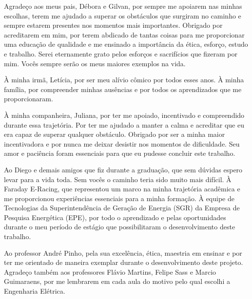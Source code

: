 \begin{agradecimentos}
\sloppy	

Agradeço aos meus pais, Débora e Gilvan, por sempre me apoiarem nas minhas escolhas, terem me ajudado a superar os obstáculos 
que surgiram no caminho e sempre estarem presentes nos momentos mais importantes. Obrigado por acreditarem em mim, por 
terem abdicado de tantas coisas para me proporcionar uma educação de qualidade e me ensinado a importância da ética, esforço, 
estudo e trabalho. Serei eternamente grato pelos esforços e sacrifícios que fizeram por mim. Vocês sempre serão os meus 
maiores exemplos na vida.

À minha irmã, Letícia, por ser meu alívio cômico por todos esses anos. À minha família, por compreender minhas ausências
e por todos os aprendizados que me proporcionaram.

À minha companheira, Juliana, por ter me apoiado, incentivado e compreendido durante essa trajetória. Por ter me 
ajudado a manter a calma e acreditar que eu era capaz de superar qualquer obstáculo. Obrigado por ser a
minha maior incentivadora e por nunca me deixar desistir nos momentos de dificuldade. Seu amor e paciência foram
essenciais para que eu pudesse concluir este trabalho.

Ao Diego e demais amigos que fiz durante a graduação, que sem dúvidas espero levar para a vida toda. Sem vocês o caminho
teria sido muito mais difícil. À Faraday E-Racing, que representou um marco na minha trajetória acadêmica e me proporcionou 
experiências essenciais para a minha formação. À equipe de Tecnologias da Superintendência de Geração de 
Energia (SGR) da Empresa de Pesquisa Energética (EPE), por todo o aprendizado e pelas oportunidades durante o meu período de estágio 
que possibilitaram o desenvolvimento deste trabalho. 

Ao professor André Pinho, pela sua excelência, ética, maestria em ensinar e por ter me orientado de maneira exemplar durante 
o desenvolvimento deste projeto. Agradeço também aos professores Flávio Martins, Felipe Sass e Marcio Guimaraens, por me 
lembrarem em cada aula do motivo pelo qual escolhi a Engenharia Elétrica.

\end{agradecimentos}